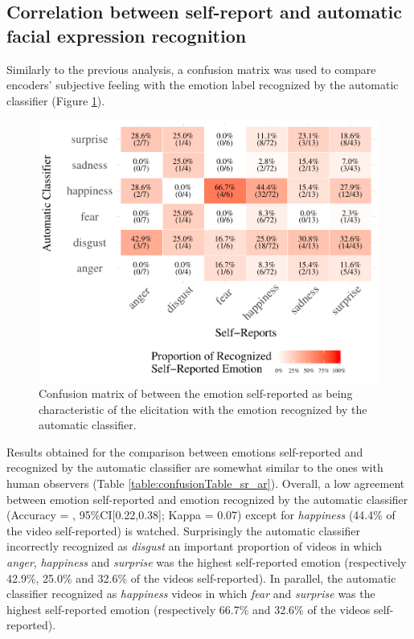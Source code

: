 \documentclass[conference,final,]{IEEEtran}
\makeatletter
\def\maxwidth{\ifdim\Gin@nat@width>\linewidth\linewidth
\else\Gin@nat@width\fi}
\let\Oldincludegraphics\includegraphics
\renewcommand{\includegraphics}[1]{\Oldincludegraphics[width=\maxwidth]{#1}}
\makeatother
\begin{document}
\hypertarget{correlation-between-self-report-and-automatic-facial-expression-recognition}{%
\subsection{Correlation between self-report and automatic facial
expression
recognition}\label{correlation-between-self-report-and-automatic-facial-expression-recognition}}

Similarly to the previous analysis, a confusion matrix was used to
compare encoders' subjective feeling with the emotion label recognized
by the automatic classifier (Figure \ref{fig:confusionMatrix_sr_ar}).

\begin{figure}
\centering
\includegraphics{ACII_2019_paper_files/figure-latex/confusionMatrix_sr_ar-1.pdf}
\caption{\label{fig:confusionMatrix_sr_ar}Confusion matrix of between
the emotion self-reported as being characteristic of the elicitation
with the emotion recognized by the automatic classifier.}
\end{figure}

Results obtained for the comparison between emotions self-reported and
recognized by the automatic classifier are somewhat similar to the ones
with human observers (Table \ref{table:confusionTable_sr_ar}). Overall,
a low agreement between emotion self-reported and emotion recognized by
the automatic classifier (Accuracy \nolinebreak = ,
95\%CI{[}0.22,0.38{]}; Kappa = 0.07) except for \emph{happiness} (44.4\%
of the video self-reported) is watched. Surprisingly the automatic
classifier incorrectly recognized as \emph{disgust} an important
proportion of videos in which \emph{anger}, \emph{happiness} and
\emph{surprise} was the highest self-reported emotion (respectively
42.9\%, 25.0\% and 32.6\% of the videos self-reported). In parallel, the
automatic classifier recognized as \emph{happiness} videos in which
\emph{fear} and \emph{surprise} was the highest self-reported emotion
(respectively 66.7\% and 32.6\% of the videos self-reported).
\end{document}
